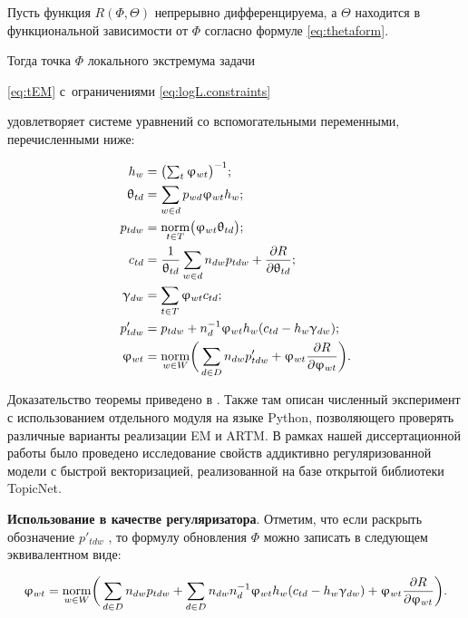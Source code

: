 \begin{Theorem} 
\label{th:TARTM} 

    Пусть функция $R(\Phi,\Theta)$ непрерывно дифференцируема, а $\Theta$ находится в функциональной зависимости от $\Phi$ согласно формуле \ref{eq:thetaform}. 

    Тогда точка $\Phi$ локального экстремума задачи 

    \eqref{eq:tEM} с~ограничениями \eqref{eq:logL.constraints} 

    удовлетворяет системе уравнений со вспомогательными переменными, перечисленными ниже: 

\begin{align*} 
    h_w         &= \bigl( \textstyle\sum_t \upvarphi_{wt} \bigr)^{-1}; \\ 
    \uptheta_{td} &= \sum_{w\in d} p_{wd} \upvarphi_{wt} h_w; \\ 
    p_{tdw}     &= \mathop{\mathrm{norm}}\limits_{t\in T} \bigl(\upvarphi_{wt}\uptheta_{td} \bigr); \\ 
    c_{td}      &= \frac1{\uptheta_{td}}\sum_{w\in d} n_{dw}p_{tdw} + \frac{\partial R}{\partial \uptheta_{td}}; \\ 
    \upgamma_{dw} &= \sum_{t\in T} \upvarphi_{wt} c_{td}; \\ 
    p'_{tdw}    &= p_{tdw} + n_d^{-1} \upvarphi_{wt}h_w (c_{td}-h_w\upgamma_{dw}); 
\\ 
    \upvarphi_{wt} &= \mathop{\mathrm{norm}}\limits_{w\in W} 
        \biggl(\, 
        \sum_{d\in D} n_{dw} p'_{tdw} 
        + \upvarphi_{wt} \frac{\partial{R}}{\partial{\ensuremath{\upvarphi}_{wt}}} 
        \biggr). 
\end{align*} 
\end{Theorem} 

Доказательство теоремы приведено в \cite{thetaless}. Также там описан численный эксперимент с использованием отдельного модуля на языке Python, позволяющего проверять различные варианты реализации EM и ARTM. В рамках нашей диссертационной работы было проведено исследование свойств аддиктивно регуляризованной модели с быстрой векторизацией, реализованной на базе открытой библиотеки TopicNet.  

\textbf{Использование в качестве регуляризатора}. Отметим, что если раскрыть обозначение $p'_{tdw}$ , то формулу обновления $\Phi$ можно записать в следующем эквивалентном виде: 

\begin{equation} 

\label{eq:Mstep_noTheta}     
    \phi_{wt} = \norm_{w\in W} 
        \biggl(\, 
        \sum_{d\in D} n_{dw} p_{tdw} 
        + \sum_{d\in D} n_{dw} n_d^{-1} \phi_{wt}h_w (c_{td}-h_w\gamma_{dw}) 
        + \phi_{wt} \frac{\partial{R}}{\partial{\phi_{wt}}} 
        \biggr). 
\end{equation} 

